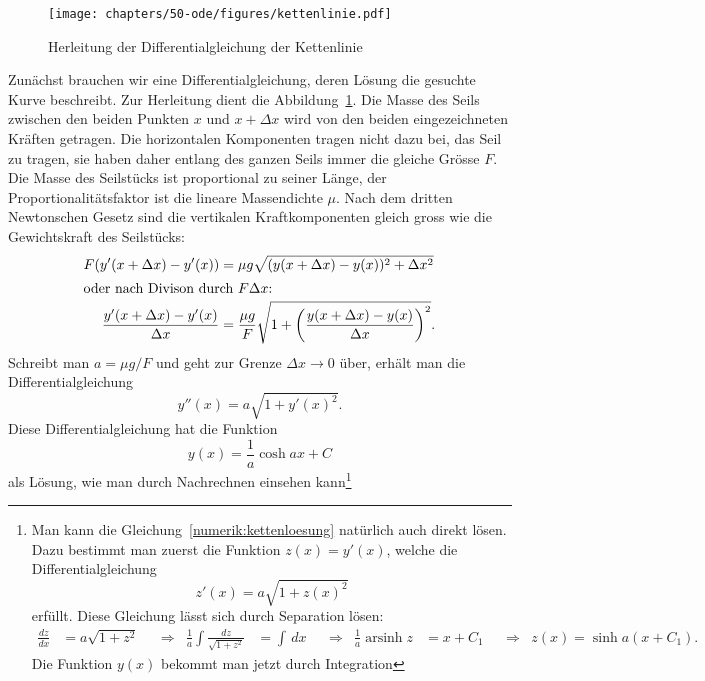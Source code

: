 \begin{loesung}
\def\asinh{\operatorname{arsinh}}
\begin{figure}
\centering
\texttt{[image: chapters/50-ode/figures/kettenlinie.pdf]}
\caption{Herleitung der Differentialgleichung der Kettenlinie
\label{numerik:kettenlinie}}
\end{figure}
Zunächst brauchen wir eine Differentialgleichung, deren Lösung die
gesuchte Kurve beschreibt.
Zur Herleitung dient die Abbildung~\ref{numerik:kettenlinie}.
Die Masse des Seils zwischen den beiden Punkten $x$ und $x+\Delta x$
wird von den beiden eingezeichneten Kräften getragen.
%
Die horizontalen Komponenten tragen nicht dazu bei, das Seil zu
tragen, sie haben daher entlang des ganzen Seils immer die gleiche
Grösse $F$.
%
Die Masse des Seilstücks ist proportional zu seiner Länge,
der Proportionalitätsfaktor ist die lineare Massendichte $\mu$.
%
Nach dem dritten Newtonschen Gesetz
sind die vertikalen Kraftkomponenten gleich gross wie die Gewichtskraft
des Seilstücks:
%
\begin{align*}
F(y'(x+\Delta x)-y'(x))
&= \mu g\sqrt{(y(x+\Delta x)-y(x))^2+\Delta x^2}
\\
\intertext{oder nach Divison durch $F\Delta x$:}
\frac{y'(x+\Delta x)-y'(x)}{\Delta x}
&=\frac{\mu g}{F}\sqrt{1+\biggl(\frac{y(x+\Delta x)-y(x)}{\Delta x}\biggr)^2}.
\end{align*}
Schreibt man $a=\mu g/F$ und geht zur Grenze $\Delta x\to 0$ über,
erhält man die Differentialgleichung
\begin{equation}
y''(x)=a\sqrt{1+y'(x)^2}.
\label{numerik:kettenloesung}
\end{equation}
Diese Differentialgleichung hat die Funktion
\[
y(x) = \frac1a \cosh ax + C
\]
%
als Lösung, wie man durch Nachrechnen einsehen kann\footnote{
Man kann die Gleichung~\eqref{numerik:kettenloesung} natürlich auch direkt
lösen. Dazu bestimmt man zuerst die Funktion $z(x)=y'(x)$, welche die
Differentialgleichung
\[
z'(x)=a\sqrt{1+z(x)^2}
\]
erfüllt.
Diese Gleichung lässt sich durch Separation lösen:
%
\[
\begin{aligned}
\frac{dz}{dx}&=a\sqrt{1+z^2}
&&\Rightarrow&
\frac1a \int\frac{dz}{\sqrt{1+z^2}}&=\int \,dx
&&\Rightarrow&
\frac1a \asinh z &=x+C_1
&&\Rightarrow&
z(x)=\sinh a(x+C_1).
\end{aligned}
\]
%
Die Funktion $y(x)$ bekommt man jetzt durch Integration
}
\end{loesung}
